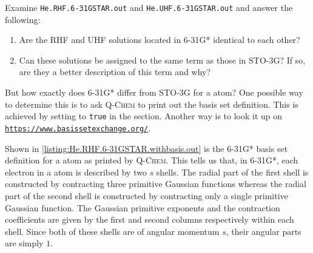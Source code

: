 			\begin{Task}
				Examine \texttt{He.RHF.6-31GSTAR.out} and \texttt{He.UHF.6-31GSTAR.out} and answer the following: 
				\begin{enumerate}[topsep=0pt,itemsep=-1ex,partopsep=1ex,parsep=1ex,label=(\alph*)]
					\item Are the RHF and UHF solutions located in 6-31G* identical to each other?
					\item Can these solutions be assigned to the same term as those in STO-3G? If so, are they a better description of this term and why?
				\end{enumerate}
			\end{Task}
		
		But how exactly does 6-31G* differ from STO-3G for a  atom?
		One possible way to determine this is to ask \textsc{Q-Chem} to print out the basis set definition.
		This is achieved by setting  to \texttt{true} in the  section.
		Another way is to look it up on \href{https://www.basissetexchange.org/}{\texttt{https://www.basissetexchange.org/}}.
		
		Shown in \cref{listing:He.RHF.6-31GSTAR.withbasis.out} is the 6-31G* basis set definition for a  atom as printed by \textsc{Q-Chem}.
		This tells us that, in 6-31G*, each electron in a  atom is described by two $s$ shells. 
		The radial part of the first shell is constructed by contracting three primitive Gaussian functions whereas the radial part of the second shell is constructed by contracting only a single primitive Gaussian function.
		The Gaussian primitive exponents and the contraction coefficients are given by the first and second columns respectively within each shell.
		Since both of these shells are of angular momentum $s$, their angular parts are simply $1$.
			

